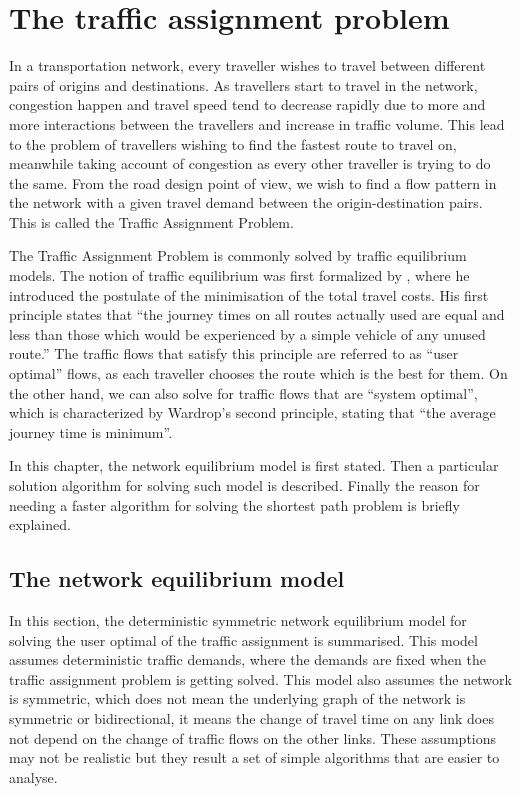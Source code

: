 \chapter{The traffic assignment problem} \label{chap:ta}

In a transportation network,
every traveller wishes to travel between different pairs of origins and destinations.
As travellers start to travel in the network,
congestion happen and travel speed tend to decrease rapidly due to more and more interactions between the travellers and increase in traffic volume.
This lead to the problem of travellers wishing to find the fastest route to travel on,
meanwhile taking account of congestion as every other traveller is trying to do the same.
From the road design point of view,
we wish to find a flow pattern in the network with a given travel demand between the origin-destination pairs. 
This is called the Traffic Assignment Problem.

The Traffic Assignment Problem is commonly solved by traffic equilibrium models.
The notion of traffic equilibrium was first formalized by \cite{Wardrop},
where he introduced the postulate of the minimisation of the total travel costs.
His first principle states that ``the journey times on all routes actually used are equal and less than those which would be experienced by a simple vehicle of any unused route.''
The traffic flows that satisfy this principle are referred to as ``user optimal'' flows,
as each traveller chooses the route which is the best for them.
On the other hand,
we can also solve for traffic flows that are ``system optimal'',
which is characterized by Wardrop's second principle, stating that ``the average journey time is minimum''.

In this chapter,
the network equilibrium model is first stated.
Then a particular solution algorithm for solving such model is described.
Finally the reason for needing a faster algorithm for solving the shortest path problem is briefly explained.

\section{The network equilibrium model}
In this section,
the deterministic symmetric network equilibrium model for solving the user optimal of the traffic assignment is summarised.
This model assumes deterministic traffic demands,
where the demands are fixed when the traffic assignment problem is getting solved.
This model also assumes the network is symmetric,
which does not mean the underlying graph of the network is symmetric or bidirectional,
it means the change of travel time on any link does not depend on the change of traffic flows on the other links.
These assumptions may not be realistic but they result a set of simple algorithms that are easier to analyse.

